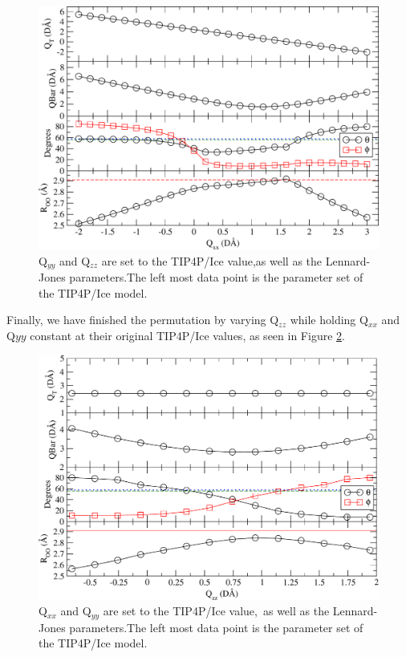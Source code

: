 \begin{figure}[h!]
\includegraphics[width=\linewidth]{Figures/Test24_plot.pdf}
\caption{\label{fig:Qyy4} Q$_{yy}$ and Q$_{zz}$ are set to the TIP4P/Ice value,as well as the Lennard-Jones parameters.The left most data point is the parameter set of the TIP4P/Ice model.}
\end{figure}

Finally, we have finished the permutation by varying Q$_{zz}$ while holding
Q$_{xx}$ and Q${yy}$ constant at their original TIP4P/Ice values, as seen
in Figure \ref{fig:Qyy5}.

\begin{figure}[h!]
\includegraphics[width=\linewidth]{Figures/Test25_plot.pdf}
\caption{\label{fig:Qyy5} Q$_{xx}$ and Q$_{yy}$ are set to the TIP4P/Ice value,\
as well as the Lennard-Jones parameters.The left most data point is the parameter set of the TIP4P/Ice model.}
\end{figure}


